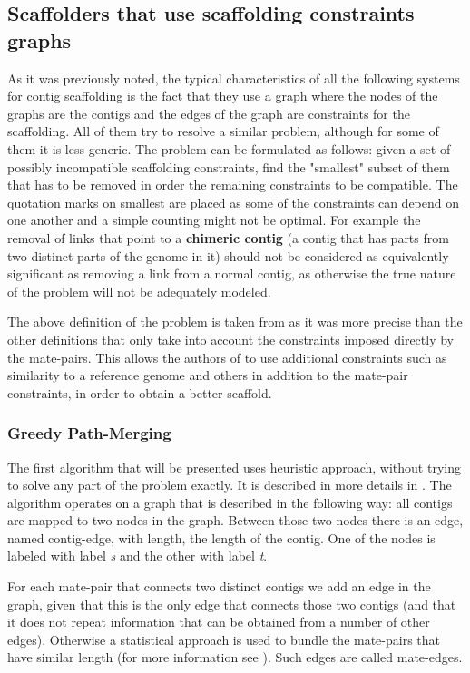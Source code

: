 \documentclass[11pt]{article}
\begin{document}
\subsection{Scaffolders that use scaffolding constraints graphs} %
\label{sub:Scaffolders that use scaffolding constraints graphs}
As it was previously noted, the typical characteristics of all the following
systems for contig scaffolding is the fact that they use a graph where the nodes
of the graphs are the contigs and the edges of the graph are constraints for the
scaffolding. All of them try to resolve a similar problem, although for some of
them it is less generic. The problem can be formulated as follows: given a set
of possibly incompatible scaffolding constraints, find the "smallest" subset of
them that has to be removed in order the remaining constraints to be compatible.
The quotation marks on smallest are placed as some of the constraints can depend
on one another and a simple counting might not be optimal. For example the
removal of links that point to a \textbf{chimeric contig} (a contig that has
parts from two distinct parts of the genome in it) should not be considered as
equivalently significant as removing a link from a normal contig, as otherwise
the true nature of the problem will not be adequately modeled. 

The above definition of the problem is taken from \cite{grass} as it was more
precise than the other definitions that only take into account the constraints
imposed directly by the mate-pairs. This allows the authors of \cite{grass} to
use additional constraints such as similarity to a reference genome and others
in addition to the mate-pair constraints, in order to obtain a better scaffold.

\subsubsection{Greedy Path-Merging} %
\label{ssub:Greedy Path-Merging}
The first algorithm that will be presented uses heuristic approach, without
trying to solve any part of the problem exactly. It is described in more details
in \cite{greedy-path-merging}. The algorithm operates on a graph that is
described in the following way: all contigs are mapped to two nodes in the
graph. Between those two nodes there is an edge, named contig-edge, with length,
the length of the contig. One of the nodes is labeled with label \emph{s} and
the other with label \emph{t}. 

For each mate-pair that connects two distinct contigs we add an edge in the
graph, given that this is the only edge that connects those two contigs (and that
it does not repeat information that can be obtained from a number of other
edges). Otherwise a statistical approach is used to bundle the mate-pairs that
have similar length (for more information see \cite{greedy-path-merging}). Such
edges are called mate-edges.
\end{document}
